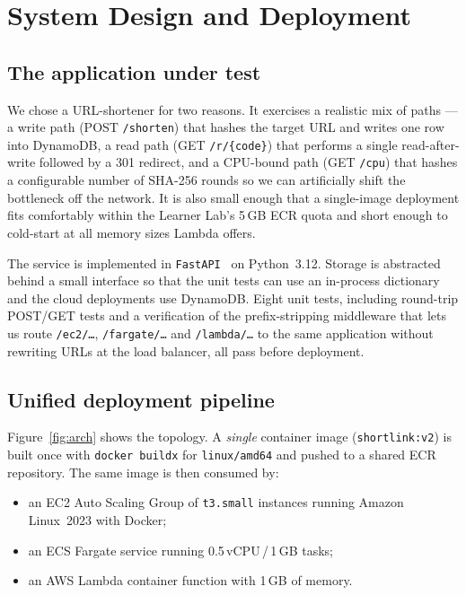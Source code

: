 \section{System Design and Deployment}
\label{sec:design}

\subsection{The application under test}

We chose a URL-shortener for two reasons. It exercises a realistic mix
of paths --- a write path (POST \texttt{/shorten}) that hashes the
target URL and writes one row into DynamoDB, a read path
(GET \texttt{/r/\{code\}}) that performs a single read-after-write
followed by a 301 redirect, and a CPU-bound path (GET \texttt{/cpu})
that hashes a configurable number of SHA-256 rounds so we can
artificially shift the bottleneck off the network. It is also small
enough that a single-image deployment fits comfortably within the
Learner Lab's 5\,GB ECR quota and short enough to cold-start at all
memory sizes Lambda offers.

The service is implemented in \texttt{FastAPI}~\cite{fastapi} on
Python~3.12. Storage is abstracted behind a small interface so that the
unit tests can use an in-process dictionary and the cloud deployments
use DynamoDB. Eight unit tests, including round-trip POST/GET tests and
a verification of the prefix-stripping middleware that lets us route
\texttt{/ec2/\dots}, \texttt{/fargate/\dots} and \texttt{/lambda/\dots}
to the same application without rewriting URLs at the load balancer,
all pass before deployment.

\subsection{Unified deployment pipeline}

Figure~\ref{fig:arch} shows the topology. A \emph{single} container image
(\texttt{shortlink:v2}) is built once with \texttt{docker buildx} for
\texttt{linux/amd64} and pushed to a shared ECR repository. The same
image is then consumed by:
\begin{itemize}[leftmargin=*,topsep=2pt,itemsep=2pt]
  \item an EC2 Auto Scaling Group of \texttt{t3.small} instances
        running Amazon Linux~2023 with Docker;
  \item an ECS Fargate service running 0.5\,vCPU\,/\,1\,GB tasks;
  \item an AWS Lambda container function with 1\,GB of memory.
\end{itemize}

